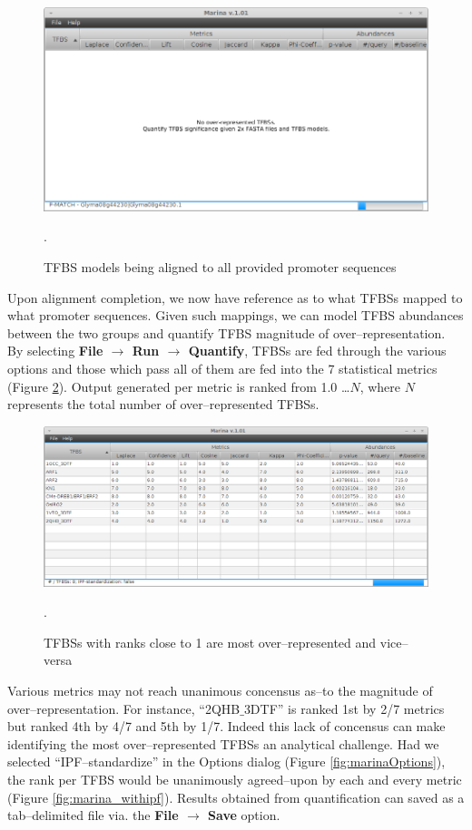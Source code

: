 \documentclass{article}
\begin{document}
\begin{figure}[htbc]
	\centering
	\includegraphics[scale=0.50]{./images/marina_runtime.png}
	\caption{TFBS models being aligned to all provided promoter sequences}.
	\label{fig:marina_runtime}
\end{figure}

Upon alignment completion, we now have reference as to what TFBSs mapped to
what promoter sequences. Given such mappings, we can model TFBS abundances
between the two groups and quantify TFBS magnitude of over--representation.
By selecting \textbf{File $\rightarrow$ Run $\rightarrow$ Quantify}, 
TFBSs are fed through the various options and those which pass all of them
are fed into the 7 statistical metrics (Figure \ref{fig:marina_quantify}). 
Output generated per metric is ranked from 1.0 \ldots $N$, where $N$ represents the total number of over--represented
TFBSs.

\begin{figure}[htbc]
	\centering
	\includegraphics[scale=0.42]{./images/marina_quantified.png}
	\caption{TFBSs with ranks close to 1 are most over--represented and vice--versa}.
	\label{fig:marina_quantify}
\end{figure}

Various metrics may not reach unanimous concensus
as--to the magnitude of over--representation. For instance, ``2QHB$\_$3DTF''
is ranked 1st by 2/7 metrics but ranked 4th by 4/7 and 5th by 1/7. Indeed this
lack of concensus can make identifying the most over--represented TFBSs an
analytical challenge. Had we selected ``IPF--standardize'' in the Options dialog
(Figure \ref{fig:marinaOptions}), the rank per TFBS would be unanimously
agreed--upon by each and every metric (Figure \ref{fig:marina_withipf}).
Results obtained from quantification can saved as a tab--delimited file via. the
\textbf{File $\rightarrow$ Save} option.
\end{document}

